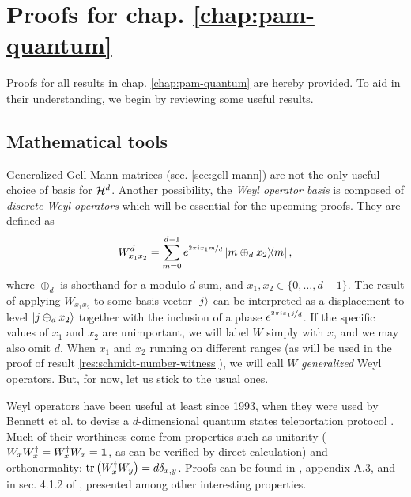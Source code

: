 \chapter{Proofs for chap. \ref{chap:pam-quantum}}
\label{ap:pam-quantum}

Proofs for all results in chap. \ref{chap:pam-quantum} are hereby provided. To aid in their understanding, we begin by reviewing some useful results.

\section{Mathematical tools}
\label{sec:ap-a-mathematical-tools}

    Generalized Gell-Mann matrices (sec. \ref{sec:gell-mann}) are not the only useful choice of basis for $\mathcal{H}^{d}$. Another possibility, the \emph{Weyl operator basis} \cite{bertlmann_2008_bloch} is composed of \emph{discrete Weyl operators} which will be essential for the upcoming proofs. They are defined as
    \begin{equation}
        W_{x_1 x_2}^d = \sum_{m = 0}^{d-1} e^{\nicefrac{2 \pi i x_1 m}{d}} \ketbra{m \oplus_d x_2}{m} ,
        \label{eq:weyl-operators}
    \end{equation}
    where $\oplus_d$ is shorthand for a modulo $d$ sum, and $x_1, x_2 \in \{0, \ldots, d-1 \}$. The result of applying $W_{x_1 x_2}$ to some basis vector $\ket{j}$ can be interpreted as a displacement to level $\ket{j \oplus_d x_2}$ together with the inclusion of a phase $e^{\nicefrac{2 \pi i x_1 j}{d}}$. If the specific values of $x_1$ and $x_2$ are unimportant, we will label $W$ simply with $x$, and we may also omit $d$. When $x_1$ and $x_2$ running on different ranges (as will be used in the proof of result \ref{res:schmidt-number-witness}), we will call $W$ \emph{generalized} Weyl operators. But, for now, let us stick to the usual ones.

    Weyl operators have been useful at least since 1993, when they were used by Bennett et al. to devise a $d$-dimensional quantum states teleportation protocol \cite{bennett_1993_teleporting}. Much of their worthiness come from properties such as unitarity ($W_x W_x^\dagger = W_x^\dagger W_x = \mathbf{1}$, as can be verified by direct calculation) and orthonormality: $\text{tr}\left( W_{x}^\dagger W_{y} \right) = d \delta_{x, y}$. Proofs can be found in \cite{bertlmann_2008_bloch}, appendix A.3, and in sec. 4.1.2 of \cite{watrous_book_2018}, presented among other interesting properties.

